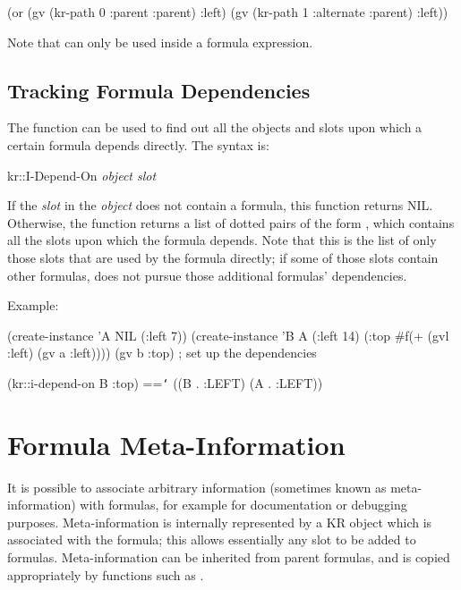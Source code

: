\begin{programexample}
(or (gv (kr-path 0 :parent :parent) :left)
    (gv (kr-path 1 :alternate :parent) :left))
\end{programexample}
Note that  can only be used inside a formula expression.


\begin{group}
\section{Tracking Formula Dependencies}

The function  can be used to find out all the
objects and slots upon which a certain formula depends directly.  The
syntax is:

\vspace{.5 line}
\begin{example}
kr::I-Depend-On {\it object slot}  \value{function}
\end{example}
\end{group}
\vspace{.5 line}

If the {\it slot} in the {\it object} does not contain a formula, this
function returns NIL.  Otherwise, the function returns a list of
dotted pairs of the form , which contains all the slots
upon which the formula depends.  Note that this is the list of only
those slots that are used by the formula directly; if some of those
slots contain other formulas,  does not pursue
those additional formulas' dependencies.

\vspace{1 line}
\begin{group}
Example:
\begin{programexample}
(create-instance 'A NIL (:left 7))
(create-instance 'B A (:left 14) (:top \#f(+ (gvl :left) (gv a :left))))
(gv b :top)	; set up the dependencies

(kr::i-depend-on B :top)
    =={\tt\char`\>} ((B . :LEFT) (A . :LEFT))
\end{programexample}
\end{group}



\section{Formula Meta-Information}

It is possible to associate arbitrary information (sometimes known
as meta-information) with formulas, for example for documentation or
debugging purposes.  Meta-information is internally represented by a
KR object which is associated with the formula; this allows
essentially any slot to be added to formulas.  Meta-information can be
inherited from parent formulas, and is copied appropriately by
functions such as .

